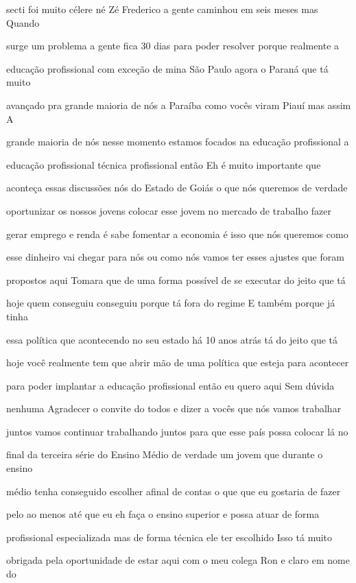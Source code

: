 \documentclass[a4paper,12pt]{article}
\begin{document}
secti foi muito célere né Zé Frederico a gente caminhou em seis meses mas Quando

surge um problema a gente fica 30 dias para poder resolver porque realmente a

educação profissional com exceção de mina São Paulo agora o Paraná que tá muito

avançado pra grande maioria de nós a Paraíba como vocês viram Piauí mas assim A

grande maioria de nós nesse momento estamos focados na educação profissional a

educação profissional técnica profissional então Eh é muito importante que

aconteça essas discussões nós do Estado de Goiás o que nós queremos de verdade

oportunizar os nossos jovens colocar esse jovem no mercado de trabalho fazer

gerar emprego e renda é sabe fomentar a economia é isso que nós queremos como

esse dinheiro vai chegar para nós ou como nós vamos ter esses ajustes que foram

propostos aqui Tomara que de uma forma possível de se executar do jeito que tá

hoje quem conseguiu conseguiu porque tá fora do regime E também porque já tinha

essa política que acontecendo no seu estado há 10 anos atrás tá do jeito que tá

hoje você realmente tem que abrir mão de uma política que esteja para acontecer

para poder implantar a educação profissional então eu quero aqui Sem dúvida

nenhuma Agradecer o convite do todos e dizer a vocês que nós vamos trabalhar

juntos vamos continuar trabalhando juntos para que esse país possa colocar lá no

final da terceira série do Ensino Médio de verdade um jovem que durante o ensino

médio tenha conseguido escolher afinal de contas o que que eu gostaria de fazer

pelo ao menos até que eu eh faça o ensino superior e possa atuar de forma

profissional especializada mas de forma técnica ele ter escolhido Isso tá muito

obrigada pela oportunidade de estar aqui com o meu colega Ron e claro em nome do
\end{document}
